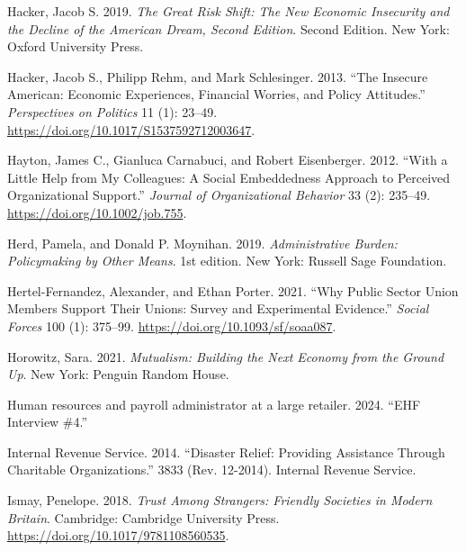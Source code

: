 \documentclass[
  11pt,
  oneside]{article}
\newlength{\cslhangindent}
\newenvironment{CSLReferences}[2] %
 {\begin{list}{}{%
  \setlength{\itemindent}{0pt}
  \setlength{\leftmargin}{0pt}
  \setlength{\parsep}{0pt}
  \ifodd #1
   \setlength{\leftmargin}{\cslhangindent}
   \setlength{\itemindent}{-1\cslhangindent}
  \fi
  \setlength{\itemsep}{#2\baselineskip}}}
 {\end{list}}
\begin{document}
\begin{CSLReferences}{1}{0}
Hacker, Jacob S. 2019. \emph{The {Great} {Risk} {Shift}: {The} {New} {Economic} {Insecurity} and the {Decline} of the {American} {Dream}, {Second} {Edition}}. Second Edition. New York: Oxford University Press.

Hacker, Jacob S., Philipp Rehm, and Mark Schlesinger. 2013. {``The {Insecure} {American}: {Economic} {Experiences}, {Financial} {Worries}, and {Policy} {Attitudes}.''} \emph{Perspectives on Politics} 11 (1): 23--49. \url{https://doi.org/10.1017/S1537592712003647}.

Hayton, James C., Gianluca Carnabuci, and Robert Eisenberger. 2012. {``With a Little Help from My Colleagues: {A} Social Embeddedness Approach to Perceived Organizational Support.''} \emph{Journal of Organizational Behavior} 33 (2): 235--49. \url{https://doi.org/10.1002/job.755}.

Herd, Pamela, and Donald P. Moynihan. 2019. \emph{Administrative {Burden}: {Policymaking} by {Other} {Means}}. 1st edition. New York: Russell Sage Foundation.

Hertel-Fernandez, Alexander, and Ethan Porter. 2021. {``Why {Public} {Sector} {Union} {Members} {Support} {Their} {Unions}: {Survey} and {Experimental} {Evidence}.''} \emph{Social Forces} 100 (1): 375--99. \url{https://doi.org/10.1093/sf/soaa087}.

Horowitz, Sara. 2021. \emph{Mutualism: {Building} the {Next} {Economy} from the {Ground} {Up}}. New York: Penguin Random House.

Human resources and payroll administrator at a large retailer. 2024. {``{EHF} Interview \#4.''}

Internal Revenue Service. 2014. {``Disaster {Relief}: Providing Assistance Through Charitable Organizations.''} 3833 (Rev. 12-2014). Internal Revenue Service.

Ismay, Penelope. 2018. \emph{Trust {Among} {Strangers}: {Friendly} {Societies} in {Modern} {Britain}}. Cambridge: Cambridge University Press. \url{https://doi.org/10.1017/9781108560535}.


\end{CSLReferences}
\end{document}
